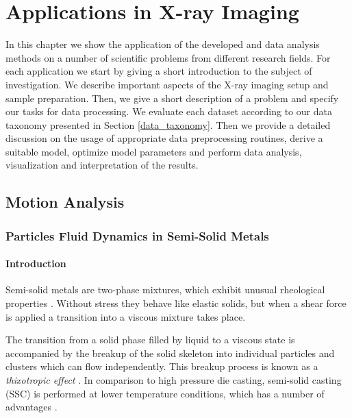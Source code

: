 \chapter {Applications in X-ray Imaging}
\label{applications}


In this chapter we show the application of the developed \opticalflow and data analysis methods on a number of scientific problems from different research fields. For each application we start by giving a short introduction to the subject of investigation. We describe important aspects of the X-ray imaging setup and sample preparation. Then, we give a short description of a problem and specify our tasks for data processing. We evaluate each dataset according to our data taxonomy presented in Section \ref{data_taxonomy}. Then we provide a detailed discussion on the usage of appropriate data preprocessing  routines, derive a suitable \opticalflow model, optimize model parameters and perform data analysis, visualization and interpretation of the results.



\section{Motion Analysis}

\subsection{Particles Fluid Dynamics in Semi-Solid Metals}

\subsubsection{Introduction}

Semi-solid metals are two-phase mixtures, which exhibit unusual rheological properties \cite{Flemings91}.
Without stress they behave like elastic solids, but when a shear force is applied a transition into a viscous mixture takes place. 

The transition from a solid phase filled by liquid to a viscous state is accompanied by the breakup of
the solid skeleton into individual particles and clusters which can flow independently. This breakup process is known as a \textit{thixotropic effect} \cite{Spencer72}. In comparison to high pressure die casting, semi-solid casting (SSC) is performed at lower temperature conditions, which has a number of advantages \cite{Zabler13}. 

